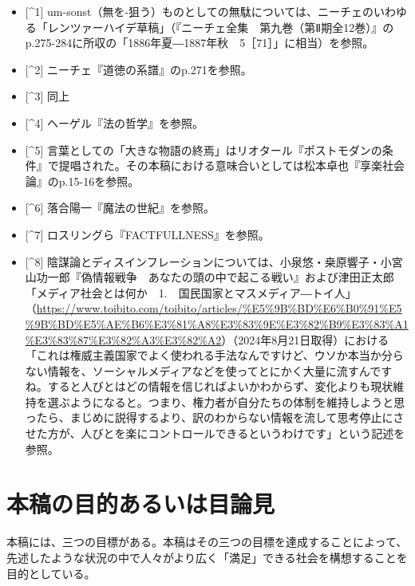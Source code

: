 \documentclass[
]{ltjsarticle}
\providecommand{\tightlist}{%
  \setlength{\itemsep}{0pt}\setlength{\parskip}{0pt}}
\begin{document}
\begin{itemize}
\tightlist
\item
  {[}\^{}1{]}
  um-sonst（無を-狙う）ものとしての無駄については、ニーチェのいわゆる「レンツァーハイデ草稿」（『ニーチェ全集　第九巻（第Ⅱ期全12巻）』のp.275-284に所収の「1886年夏―1887年秋　5［71］」に相当）を参照。
\item
  {[}\^{}2{]} ニーチェ『道徳の系譜』のp.271を参照。
\item
  {[}\^{}3{]} 同上
\item
  {[}\^{}4{]} ヘーゲル『法の哲学』を参照。
\item
  {[}\^{}5{]}
  言葉としての「大きな物語の終焉」はリオタール『ポストモダンの条件』で提唱された。その本稿における意味合いとしては松本卓也『享楽社会論』のp.15-16を参照。
\item
  {[}\^{}6{]} 落合陽一『魔法の世紀』を参照。
\item
  {[}\^{}7{]} ロスリングら『FACTFULLNESS』を参照。
\item
  {[}\^{}8{]}
  陰謀論とディスインフレーションについては、小泉悠・桒原響子・小宮山功一郎『偽情報戦争　あなたの頭の中で起こる戦い』および津田正太郎「メディア社会とは何か　1.　国民国家とマスメディア―トイ人」（\url{https://www.toibito.com/toibito/articles/\%E5\%9B\%BD\%E6\%B0\%91\%E5\%9B\%BD\%E5\%AE\%B6\%E3\%81\%A8\%E3\%83\%9E\%E3\%82\%B9\%E3\%83\%A1\%E3\%83\%87\%E3\%82\%A3\%E3\%82\%A2}）（2024年8月21日取得）における「これは権威主義国家でよく使われる手法なんですけど、ウソか本当か分らない情報を、ソーシャルメディアなどを使ってとにかく大量に流すんですね。すると人びとはどの情報を信じればよいかわからず、変化よりも現状維持を選ぶようになると。つまり、権力者が自分たちの体制を維持しようと思ったら、まじめに説得するより、訳のわからない情報を流して思考停止にさせた方が、人びとを楽にコントロールできるというわけです」という記述を参照。
\end{itemize}

\section{本稿の目的あるいは目論見}\label{ux672cux7a3fux306eux76eeux7684ux3042ux308bux3044ux306fux76eeux8ad6ux898b}

本稿には、三つの目標がある。本稿はその三つの目標を達成することによって、先述したような状況の中で人々がより広く「満足」できる社会を構想することを目的としている。
\end{document}
